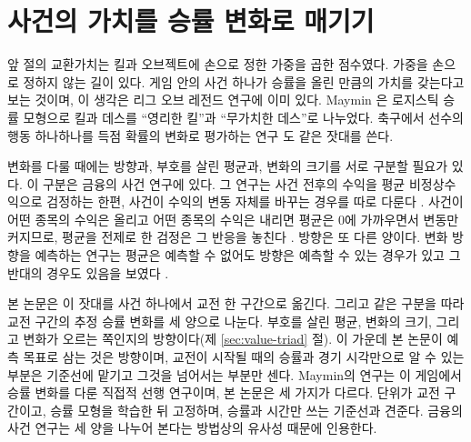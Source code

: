 \section{사건의 가치를 승률 변화로 매기기}
\label{sec:rel-eventvalue}

앞 절의 교환가치는 킬과 오브젝트에 손으로 정한 가중을 곱한 점수였다. 가중을 손으로 정하지 않는 길이 있다. 게임 안의 사건 하나가 승률을 올린 만큼의 가치를 갖는다고 보는 것이며, 이 생각은 리그 오브 레전드 연구에 이미 있다. Maymin \cite{maymin2021smart}은 로지스틱 승률 모형으로 킬과 데스를 ``영리한 킬''과 ``무가치한 데스''로 나누었다. 축구에서 선수의 행동 하나하나를 득점 확률의 변화로 평가하는 연구 \cite{DecroosEtAl2019}도 같은 잣대를 쓴다.

변화를 다룰 때에는 방향과, 부호를 살린 평균과, 변화의 크기를 서로 구분할 필요가 있다. 이 구분은 금융의 사건 연구에 있다. 그 연구는 사건 전후의 수익을 평균 비정상수익으로 검정하는 한편, 사건이 수익의 변동 자체를 바꾸는 경우를 따로 다룬다 \cite{BrownWarner1985}. 사건이 어떤 종목의 수익은 올리고 어떤 종목의 수익은 내리면 평균은 0에 가까우면서 변동만 커지므로, 평균을 전제로 한 검정은 그 반응을 놓친다 \cite{BoehmerEtAl1991}. 방향은 또 다른 양이다. 변화 방향을 예측하는 연구는 평균은 예측할 수 없어도 방향은 예측할 수 있는 경우가 있고 그 반대의 경우도 있음을 보였다 \cite{ChristoffersenDiebold2006}.

본 논문은 이 잣대를 사건 하나에서 교전 한 구간으로 옮긴다. 그리고 같은 구분을 따라 교전 구간의 추정 승률 변화를 세 양으로 나눈다. 부호를 살린 평균, 변화의 크기, 그리고 변화가 오르는 쪽인지의 방향이다(제 \ref{sec:value-triad} 절). 이 가운데 본 논문이 예측 목표로 삼는 것은 방향이며, 교전이 시작될 때의 승률과 경기 시각만으로 알 수 있는 부분은 기준선에 맡기고 그것을 넘어서는 부분만 센다. Maymin의 연구는 이 게임에서 승률 변화를 다룬 직접적 선행 연구이며, 본 논문은 세 가지가 다르다. 단위가 교전 구간이고, 승률 모형을 학습한 뒤 고정하며, 승률과 시간만 쓰는 기준선과 견준다. 금융의 사건 연구는 세 양을 나누어 본다는 방법상의 유사성 때문에 인용한다.
